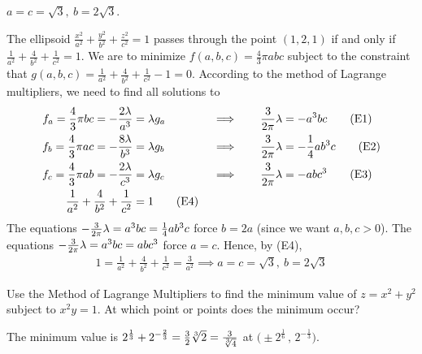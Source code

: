 \begin{answer}
$a=c=\sqrt{3},\ b=2\sqrt{3}$.
\end{answer}

\begin{solution}
The ellipsoid $\frac{x^2}{a^2}+\frac{y^2}{b^2}+\frac{z^2}{c^2}=1$ passes 
through the point $(1,2,1)$ if and only if 
$\frac{1}{a^2}+\frac{4}{b^2}+\frac{1}{c^2}=1$.
We are to minimize  $f(a,b,c)=\frac{4}{3}\pi abc$ subject to the constraint 
that $g(a,b,c) = \frac{1}{a^2}+\frac{4}{b^2}+\frac{1}{c^2} -1=0$.
According to the method of Lagrange multipliers, we need to find 
all solutions to
\begin{alignat*}{7}
f_a = \frac{4}{3}\pi bc = -\frac{2\lambda}{a^3}  &= \lambda g_a 
      \quad&&\implies\quad && \frac{3}{2\pi}\lambda=-a^3bc \tag{E1} \\ 
f_b = \frac{4}{3}\pi ac = - \frac{8\lambda}{b^3} &= \lambda g_b 
      \quad&&\implies\quad && \frac{3}{2\pi}\lambda=-\frac{1}{4}ab^3c \tag{E2} \\ 
f_c = \frac{4}{3}\pi ab = -\frac{2\lambda}{c^3} &= \lambda g_c 
       \quad&&\implies\quad && \frac{3}{2\pi}\lambda=-abc^3 \tag{E3} \\ 
\frac{1}{a^2}+\frac{4}{b^2}+\frac{1}{c^2}&=1 \tag{E4}
\end{alignat*}
The equations $-\frac{3}{2\pi}\lambda=a^3bc=\frac{1}{4}ab^3c$ force $b=2a$
(since we want $a,b,c>0$). The equations $-\frac{3}{2\pi}\lambda=a^3bc=abc^3$ force 
$a=c$. Hence, by (E4), 
\begin{align*}
1=\frac{1}{a^2}+\frac{4}{b^2}+\frac{1}{c^2}=\frac{3}{a^2}
\implies a=c=\sqrt{3},\ b=2\sqrt{3}
\end{align*}
\end{solution}


\begin{question}[M200 2005D] %
Use the Method of Lagrange Multipliers to find the minimum value of 
$z = x^2 + y^2$ subject to $x^2 y = 1$. At which point or points
does the minimum occur?
\end{question}

%

\begin{answer}
The minimum value is 
$2^{\frac{1}{3}} + 2^{-\frac{2}{3}}
       =\frac{3}{2}\root{3}\of{2}
       =\frac{3}{\sqrt[3]{4}}$ at
$\big(\pm 2^{\frac{1}{6}}\,,\, 2^{-\frac{1}{3}}\big)$.
\end{answer}

